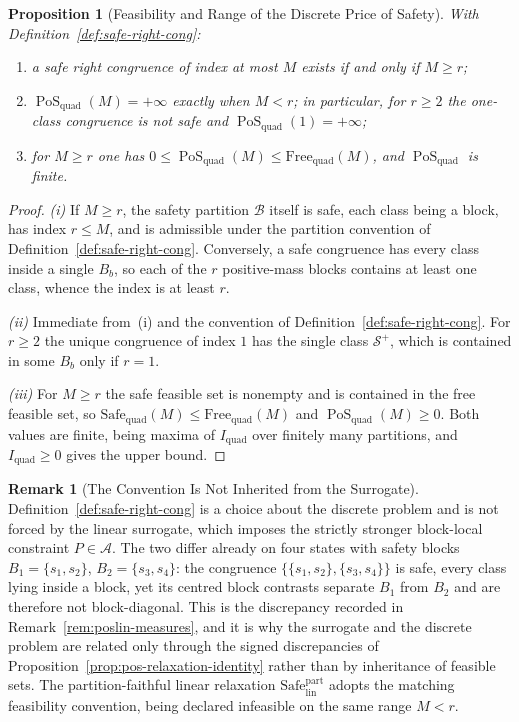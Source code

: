 \documentclass[12pt]{article}
\newtheorem{proposition}[theorem]{Proposition}
\theoremstyle{definition}
\newtheorem{remark}[theorem]{Remark}
\DeclareMathOperator{\PoS}{PoS}
\newcommand{\PoSquad}{\PoS_{\mathrm{quad}}}
\newcommand{\Splus}{\mathcal S^{+}}
\begin{document}
\begin{proposition}[Feasibility and Range of the Discrete Price of Safety]
\label{prop:pos-quad-consistent}
With Definition~\ref{def:safe-right-cong}:
\begin{enumerate}[label=(\roman*)]
\item a safe right congruence of index at most $M$ exists if and only if
$M\ge r$;
\item $\PoSquad(M)=+\infty$ exactly when $M<r$; in particular, for $r\ge2$ the
one-class congruence is not safe and $\PoSquad(1)=+\infty$;
\item for $M\ge r$ one has
$0\le\PoSquad(M)\le\mathrm{Free}_{\mathrm{quad}}(M)$, and $\PoSquad$ is finite.
\end{enumerate}
\end{proposition}

\begin{proof}
\emph{(i)} If $M\ge r$, the safety partition $\mathcal B$ itself is safe, each
class being a block, has index $r\le M$, and is admissible under the
partition convention of Definition~\ref{def:safe-right-cong}.  Conversely,
a safe congruence has every class inside a single $B_b$, so each of the $r$
positive-mass blocks contains at least one class, whence the index is at
least $r$.

\emph{(ii)} Immediate from~(i) and the convention of
Definition~\ref{def:safe-right-cong}.  For $r\ge2$ the unique congruence of
index $1$ has the single class $\Splus$, which is contained in some $B_b$ only
if $r=1$.

\emph{(iii)} For $M\ge r$ the safe feasible set is nonempty and is contained in
the free feasible set, so
$\mathrm{Safe}_{\mathrm{quad}}(M)\le\mathrm{Free}_{\mathrm{quad}}(M)$ and
$\PoSquad(M)\ge0$.  Both values are finite, being maxima of
$I_{\mathrm{quad}}$ over finitely many partitions, and
$I_{\mathrm{quad}}\ge0$ gives the upper bound.
\end{proof}

\begin{remark}[The Convention Is Not Inherited from the Surrogate]
\label{rem:pos-convention-independent}
Definition~\ref{def:safe-right-cong} is a choice about the discrete problem and
is not forced by the linear surrogate, which imposes the strictly stronger
block-local constraint $P\in\mathcal A$.  The two differ already on four states
with safety blocks $B_1=\{s_1,s_2\}$, $B_2=\{s_3,s_4\}$: the congruence
$\{\{s_1,s_2\},\{s_3,s_4\}\}$ is safe, every class lying inside a block, yet its
centred block contrasts separate $B_1$ from $B_2$ and are therefore not
block-diagonal.  This is the discrepancy recorded in
Remark~\ref{rem:poslin-measures}, and it is why the surrogate and the discrete
problem are related only through the signed discrepancies of
Proposition~\ref{prop:pos-relaxation-identity} rather than by inheritance of
feasible sets.  The partition-faithful linear relaxation
$\mathrm{Safe}_{\mathrm{lin}}^{\mathrm{part}}$ adopts the matching feasibility
convention, being declared infeasible on the same range $M<r$.
\end{remark}
\end{document}
